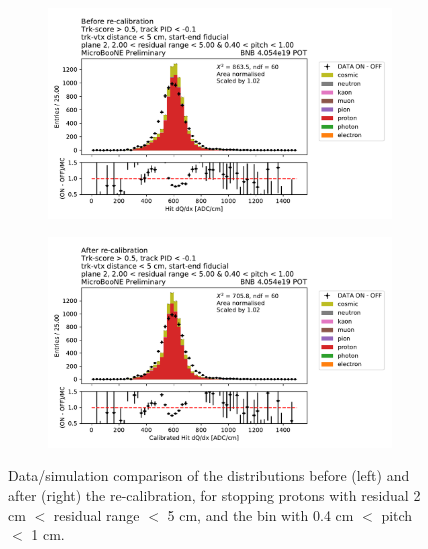 \begin{figure}[H] 
\begin{center}
    \begin{subfigure}[b]{0.45\textwidth}
    \centering
    \includegraphics[width=1.00\textwidth]{stopping_muons_protons/protons_200_residualrange_500_040_pitch_100apres.pdf}
    \end{subfigure}
    \begin{subfigure}[b]{0.45\textwidth}
    \centering
    \includegraphics[width=1.00\textwidth]{stopping_muons_protons/protons_200_residualrange_500_040_pitch_100depois.pdf}
    \end{subfigure}
\caption{Data/simulation comparison of the \dqdx distributions before (left) and after (right) the re-calibration, for stopping protons with residual 2 cm $<$ residual range $<$ 5 cm, and the bin with 0.4 cm $<$ pitch $<$ 1 cm.}
\label{fig:stopping_protons_small_rr_before_after}
\end{center}
\end{figure}


